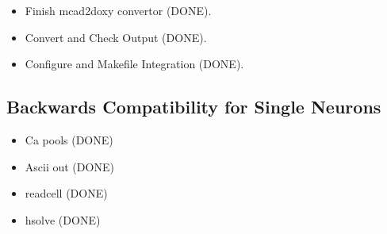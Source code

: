 \documentclass[12pt]{article}
\begin{document}
\begin{itemize}
\item Finish mcad2doxy convertor (DONE).
\item Convert and Check Output (DONE).
\item Configure and Makefile Integration (DONE).
\end{itemize}

\subsection{Backwards Compatibility for Single Neurons}

\begin{itemize}
\item Ca pools (DONE)
\item Ascii out (DONE)
\item readcell (DONE)
\item hsolve (DONE)
\end{itemize}
\end{document}

